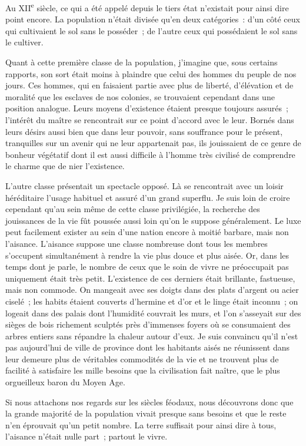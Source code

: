 \documentclass[french,twoside]{book} %
\begin{document}
\noindent Au XII\textsuperscript{e} siècle, ce qui a été appelé depuis le tiers état n’existait pour ainsi dire point encore. La population n’était divisée qu’en deux catégories : d’un côté ceux qui cultivaient le sol sans le posséder ; de l’autre ceux qui possédaient le sol sans le cultiver.\par
Quant à cette première classe de la population, j’imagine que, sous certains rapports, son sort était moins à plaindre que celui des hommes du peuple de nos jours. Ces hommes, qui en faisaient partie avec plus de liberté, d’élévation et de moralité que les esclaves de nos colonies, se trouvaient cependant dans une position analogue. Leurs moyens d’existence étaient presque toujours assurés ; l’intérêt du maître se rencontrait sur ce point d’accord avec le leur. Bornés dans leurs désirs aussi bien que dans leur pouvoir, sans souffrance pour le présent, tranquilles sur un avenir qui ne leur appartenait pas, ils jouissaient de ce genre de bonheur végétatif dont il est aussi difficile à l’homme très civilisé de comprendre le charme que de nier l’existence.\par
L'autre classe présentait un spectacle opposé. Là se rencontrait avec un loisir héréditaire l’usage habituel et assuré d’un grand superflu. Je suis loin de croire cependant qu’au sein même de cette classe privilégiée, la recherche des jouissances de la vie fût poussée aussi loin qu’on le suppose généralement. Le luxe peut facilement exister au sein d’une nation encore à moitié barbare, mais non l’aisance. L'aisance suppose une classe nombreuse dont tous les membres s’occupent simultanément à rendre la vie plus douce et plus aisée. Or, dans les temps dont je parle, le nombre de ceux que le soin de vivre ne préoccupait pas uniquement était très petit. L’existence de ces derniers était brillante, fastueuse, mais non commode. On mangeait avec ses doigts dans des plats d’argent ou acier ciselé ; les habits étaient couverts d’hermine et d’or et le linge était inconnu ; on logeait dans des palais dont l’humidité couvrait les murs, et l’on s’asseyait sur des sièges de bois richement sculptés près d’immenses foyers où se consumaient des arbres entiers sans répandre la chaleur autour d’eux. Je suis convaincu qu’il n’est pas aujourd’hui de ville de province dont les habitants aisés ne réunissent dans leur demeure plus de véritables commodités de la vie et ne trouvent plus de facilité à satisfaire les mille besoins que la civilisation fait naître, que le plus orgueilleux baron du Moyen Age.\par
Si nous attachons nos regards sur les siècles féodaux, nous découvrons donc que la grande majorité de la population vivait presque sans besoins et que le reste n’en éprouvait qu’un petit nombre. La terre suffisait pour ainsi dire à tous, l’aisance n’était nulle part ; partout le vivre.\par
\end{document}
